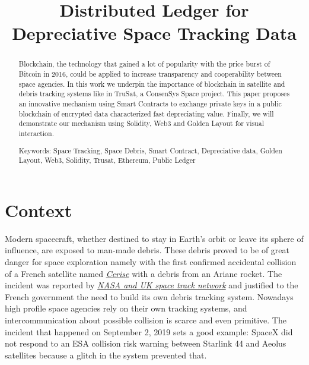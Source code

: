 \documentclass[conference]{IEEEtran}
\begin{document}
\title{Distributed Ledger for Depreciative Space Tracking Data}

\author{
}

\maketitle
\thispagestyle{plain}


\begin{abstract}
Blockchain, the technology that gained a lot of popularity with the price burst of Bitcoin in 2016, could be applied to increase transparency and cooperability between space agencies. In this work we underpin the importance of blockchain in satellite and debris tracking systems like in TruSat, a ConsenSys Space project. This paper proposes an innovative mechanism using Smart Contracts to exchange private keys in a public blockchain of encrypted data characterized fast depreciating value. Finally, we will demonstrate our mechanism using Solidity, Web3 and Golden Layout for visual interaction.

Keywords: Space Tracking, Space Debris, Smart Contract, Depreciative data, Golden Layout, Web3, Solidity, Trusat, Ethereum, Public Ledger
\end{abstract}

\IEEEpeerreviewmaketitle

\section{Context}
Modern spacecraft, whether destined to stay in Earth's orbit or leave its sphere of influence, are exposed to man-made debris. These debris proved to be of great danger for space exploration namely with the first confirmed accidental collision of a French satellite named \href{https://en.wikipedia.org/wiki/Cerise_(satellite)}{\textit{Cerise}} with a debris from an Ariane rocket. The incident was reported by \href{https://nssdc.gsfc.nasa.gov/nmc/spacecraft/display.action?id=1995-033B}{\textit{NASA and UK space track network}} and justified to the French government the need to build its own debris tracking system. Nowadays high profile space agencies rely on their own tracking systems, and intercommunication about possible collision is scarce and even primitive. The incident that happened on September 2, 2019 sets a good example: SpaceX did not respond to an ESA collision risk warning between Starlink 44 and Aeolus satellites because a glitch in the system prevented that.
\end{document}
